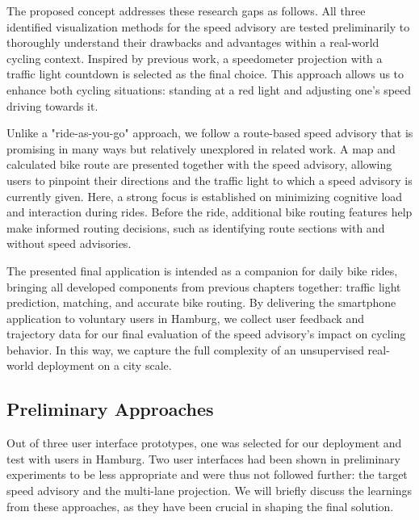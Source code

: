 The proposed concept addresses these research gaps as follows. All three identified visualization methods for the speed advisory are tested preliminarily to thoroughly understand their drawbacks and advantages within a real-world cycling context. Inspired by previous work, a speedometer projection with a traffic light countdown is selected as the final choice. This approach allows us to enhance both cycling situations: standing at a red light and adjusting one's speed driving towards it.

Unlike a "ride-as-you-go" approach, we follow a route-based speed advisory that is promising in many ways but relatively unexplored in related work. A map and calculated bike route are presented together with the speed advisory, allowing users to pinpoint their directions and the traffic light to which a speed advisory is currently given. Here, a strong focus is established on minimizing cognitive load and interaction during rides. Before the ride, additional bike routing features help make informed routing decisions, such as identifying route sections with and without speed advisories. 

The presented final application is intended as a companion for daily bike rides, bringing all developed components from previous chapters together: traffic light prediction, matching, and accurate bike routing. By delivering the smartphone application to voluntary users in Hamburg, we collect user feedback and trajectory data for our final evaluation of the speed advisory's impact on cycling behavior. In this way, we capture the full complexity of an unsupervised real-world deployment on a city scale.

\subsection{Preliminary Approaches}

Out of three user interface prototypes, one was selected for our deployment and test with users in Hamburg. Two user interfaces had been shown in preliminary experiments to be less appropriate and were thus not followed further: the target speed advisory and the multi-lane projection. We will briefly discuss the learnings from these approaches, as they have been crucial in shaping the final solution.

